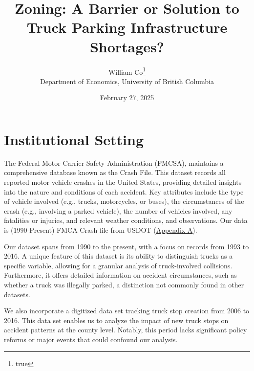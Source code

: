 \documentclass[
  8pt,
  12pt]{article}
\begin{document}
\def\spacingset#1{\renewcommand{\baselinestretch}%
{#1}\small\normalsize} \spacingset{1}



\date{February 27, 2025}
\title{\bf Zoning: A Barrier or Solution to Truck Parking Infrastructure
Shortages?}
\author{
William Co\thanks{true}\\
Department of Economics, University of British Columbia\\
}
\maketitle

\bigskip
\bigskip
\begin{abstract}

\end{abstract}


\newpage
\spacingset{1.9} %

\section{Institutional Setting}\label{institutional-setting}

The Federal Motor Carrier Safety Administration (FMCSA), maintains a
comprehensive database known as the Crash File. This dataset records all
reported motor vehicle crashes in the United States, providing detailed
insights into the nature and conditions of each accident. Key attributes
include the type of vehicle involved (e.g., trucks, motorcycles, or
buses), the circumstances of the crash (e.g., involving a parked
vehicle), the number of vehicles involved, any fatalities or injuries,
and relevant weather conditions, and observations. Our data is
(1990-Present) FMCA Crash file from USDOT
(\label{sec:appendix-a}\hyperref[sec-a.-visualization-of-dataset.-]{Appendix
A}).

Our dataset spans from 1990 to the present, with a focus on records from
1993 to 2016. A unique feature of this dataset is its ability to
distinguish trucks as a specific variable, allowing for a granular
analysis of truck-involved collisions. Furthermore, it offers detailed
information on accident circumstances, such as whether a truck was
illegally parked, a distinction not commonly found in other datasets.

We also incorporate a digitized data set tracking truck stop creation
from 2006 to 2016. This data set enables us to analyze the impact of new
truck stops on accident patterns at the county level. Notably, this
period lacks significant policy reforms or major events that could
confound our analysis.
\end{document}
